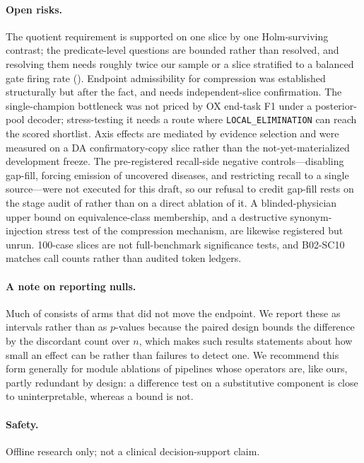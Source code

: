 \paragraph{Open risks.}
The quotient requirement is supported on one slice by one Holm-surviving contrast; the predicate-level questions are bounded rather than resolved, and resolving them needs roughly twice our sample or a slice stratified to a balanced gate firing rate ().
Endpoint admissibility for compression was established structurally but after the fact, and needs independent-slice confirmation.
The single-champion bottleneck was not priced by OX end-task F1 under a posterior-pool decoder; stress-testing it needs a route where \texttt{LOCAL\_ELIMINATION} can reach the scored shortlist.
Axis effects are mediated by evidence selection and were measured on a DA confirmatory-copy slice rather than the not-yet-materialized development freeze.
The pre-registered recall-side negative controls---disabling gap-fill, forcing emission of uncovered diseases, and restricting recall to a single source---were not executed for this draft, so our refusal to credit gap-fill rests on the stage audit of  rather than on a direct ablation of it.
A blinded-physician upper bound on equivalence-class membership, and a destructive synonym-injection stress test of the compression mechanism, are likewise registered but unrun.
100-case slices are not full-benchmark significance tests, and B02-SC10 matches call counts rather than audited token ledgers.

\paragraph{A note on reporting nulls.}
Much of  consists of arms that did not move the endpoint.
We report these as intervals rather than as $p$-values because the paired design bounds the difference by the discordant count over $n$, which makes such results statements about how small an effect can be rather than failures to detect one.
We recommend this form generally for module ablations of pipelines whose operators are, like ours, partly redundant by design: a difference test on a substitutive component is close to uninterpretable, whereas a bound is not.

\paragraph{Safety.}
Offline research only; not a clinical decision-support claim.

